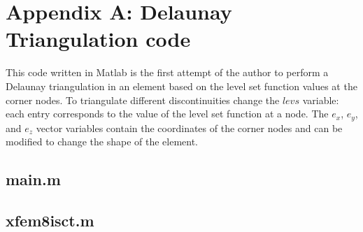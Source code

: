 \section{Appendix A: Delaunay Triangulation code}
\label{sec:delaunay_triangulation_code}

This code written in Matlab is the first attempt of the author to perform a Delaunay triangulation in an element based on the level set function values at the corner nodes. To triangulate different discontinuities change the $levs$ variable: each entry corresponds to the value of the level set function at a node. The $e_x$, $e_y$, and $e_z$ vector variables contain the coordinates of the corner nodes and can be modified to change the shape of the element.



\subsection{main.m}




\subsection{xfem8isct.m}




